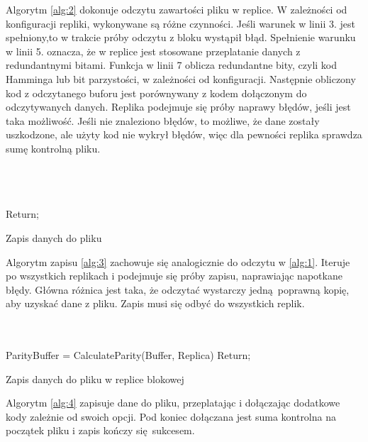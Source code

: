 Algorytm \ref{alg:2} dokonuje odczytu zawartości pliku w replice. W zależności od konfiguracji repliki, wykonywane są różne czynności. Jeśli warunek w linii 3. jest spełniony,to w trakcie próby odczytu z bloku wystąpił błąd. Spełnienie warunku w linii 5. oznacza, że w replice jest stosowane przeplatanie danych z redundantnymi bitami. Funkcja w linii 7 oblicza redundantne bity, czyli kod Hamminga lub bit parzystości, w zależności od konfiguracji. Następnie obliczony kod z odczytanego buforu jest porównywany z kodem dołączonym do odczytywanych danych. Replika podejmuje się próby naprawy błędów, jeśli jest taka możliwość. Jeśli nie znaleziono błędów, to możliwe, że dane zostały uszkodzone, ale użyty kod nie wykrył błędów, więc dla pewności replika sprawdza sumę kontrolną pliku.
\\
\\
\\
\\
{\small
\begin{pseudokod}[H]
    Return;
\caption{Zapis danych do pliku}\label{alg:3}
\end{pseudokod}
}
Algorytm zapisu \ref{alg:3} zachowuje się analogicznie do odczytu w \ref{alg:1}. Iteruje po wszystkich replikach i podejmuje się próby zapisu, naprawiając napotkane błędy. Główna różnica jest taka, że odczytać wystarczy jedną poprawną kopię, aby uzyskać dane z pliku. Zapis musi się odbyć do wszystkich replik.
\\
\\
\\
{\small
\begin{pseudokod}[H]
ParityBuffer = CalculateParity(Buffer, Replica)\;
    Return;
\caption{Zapis danych do pliku w replice blokowej}\label{alg:4}
\end{pseudokod}
}

Algorytm \ref{alg:4} zapisuje dane do pliku, przeplatając i dołączając dodatkowe kody zależnie od swoich opcji. Pod koniec dołączana jest suma kontrolna na początek pliku i zapis kończy się sukcesem.
